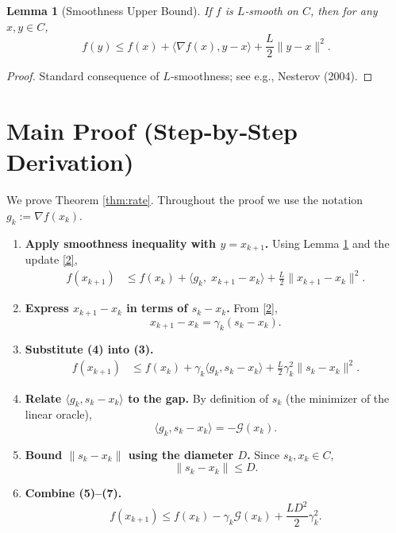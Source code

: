\documentclass{article}
\newtheorem{lemma}{Lemma}
\newcommand{\gap}{\mathcal{G}}
\begin{document}
\begin{lemma}[Smoothness Upper Bound]\label{lem:smooth}
If $f$ is $L$‑smooth on $C$, then for any $x,y\in C$,
\[
f(y) \le f(x) + \langle\nabla f(x),y-x\rangle + \frac{L}{2}\|y-x\|^{2}.
\]
\end{lemma}
\begin{proof}
Standard consequence of $L$‑smoothness; see e.g., Nesterov (2004). \qedhere
\end{proof}

\section*{Main Proof (Step‑by‑Step Derivation)}
We prove Theorem \ref{thm:rate}.  Throughout the proof we use the notation $g_k:=\nabla f(x_k)$.

\begin{enumerate}[label=[Step \arabic*]]
\item \textbf{Apply smoothness inequality with $y=x_{k+1}$.}  
Using Lemma \ref{lem:smooth} and the update \eqref{2},
\[
\begin{aligned}
f(x_{k+1})
&\le f(x_k) + \big\langle g_k,\;x_{k+1}-x_k\big\rangle
          + \frac{L}{2}\|x_{k+1}-x_k\|^{2} .
\end{aligned}
\tag{3}
\]

\item \textbf{Express $x_{k+1}-x_k$ in terms of $s_k-x_k$.}  
From \eqref{2},
\[
x_{k+1}-x_k = \gamma_k (s_k - x_k) .
\tag{4}
\]

\item \textbf{Substitute (4) into (3).}  
\[
\begin{aligned}
f(x_{k+1})
&\le f(x_k) + \gamma_k\langle g_k, s_k-x_k\rangle
          + \frac{L}{2}\gamma_k^{2}\|s_k-x_k\|^{2}.
\end{aligned}
\tag{5}
\]

\item \textbf{Relate $\langle g_k, s_k-x_k\rangle$ to the gap.}  
By definition of $s_k$ (the minimizer of the linear oracle),
\[
\langle g_k, s_k-x_k\rangle = -\gap(x_k).
\tag{6}
\]

\item \textbf{Bound $\|s_k-x_k\|$ using the diameter $D$.}  
Since $s_k,x_k\in C$, 
\[
\|s_k-x_k\|\le D .
\tag{7}
\]

\item \textbf{Combine (5)–(7).}  
\[
f(x_{k+1}) \le f(x_k) - \gamma_k \gap(x_k) + \frac{L D^{2}}{2}\gamma_k^{2}.
\tag{8}
\]


\end{enumerate}
\end{document}
